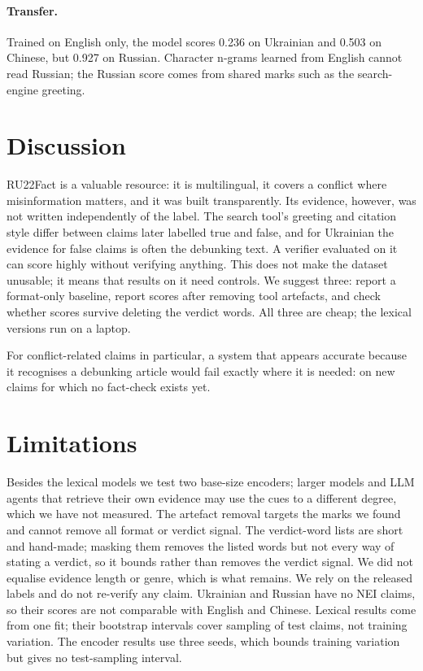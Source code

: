 \documentclass[11pt,a4paper]{article}
\begin{document}
\paragraph{Transfer.} Trained on English only, the model scores 0.236 on Ukrainian and 0.503 on Chinese, but 0.927 on
Russian. Character n-grams learned from English cannot read Russian; the Russian score comes from shared marks such as
the search-engine greeting.

\section{Discussion}

RU22Fact is a valuable resource: it is multilingual, it covers a conflict where misinformation matters, and it was
built transparently. Its evidence, however, was not written independently of the label. The search tool's greeting
and citation style differ between claims later labelled true and false, and for Ukrainian the evidence for false claims
is often the debunking text. A verifier evaluated on it can score highly without verifying anything. This does not
make the dataset unusable; it means that results on it need controls. We suggest three: report a format-only
baseline, report scores after removing tool artefacts, and check whether scores survive deleting the verdict words.
All three are cheap; the lexical versions run on a laptop.

For conflict-related claims in particular, a system that appears accurate because it recognises a debunking article
would fail exactly where it is needed: on new claims for which no fact-check exists yet.

\section{Limitations}

Besides the lexical models we test two base-size encoders; larger models and LLM agents that retrieve their own
evidence may use the cues to a different degree, which we have not measured. The artefact removal targets the marks we found and cannot remove all format or
verdict signal. The verdict-word lists are short and hand-made; masking them removes the listed words but not every way of stating
a verdict, so it bounds rather than removes the verdict signal. We did not equalise evidence length or genre, which
is what remains. We rely on the released labels and do not re-verify any claim. Ukrainian and Russian have no NEI claims, so
their scores are not comparable with English and Chinese. Lexical results come from one fit; their bootstrap intervals cover sampling of test claims, not training
variation. The encoder results use three seeds, which bounds training variation but gives no test-sampling interval.
\end{document}
